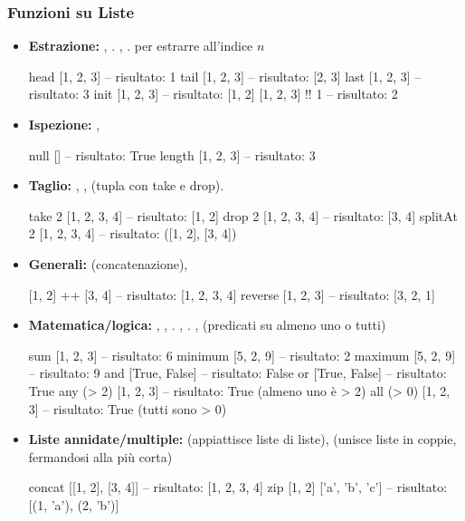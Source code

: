 \documentclass[a4paper,11pt]{report}
\begin{document}
\subsubsection{Funzioni su Liste}
\begin{itemize}
    \item \textbf{Estrazione:} , . , . \code{(!!)} per estrarre all'indice $n$
        \begin{haskellbox}{}
head [1, 2, 3]  -- risultato: 1
tail [1, 2, 3]  -- risultato: [2, 3]
last [1, 2, 3]  -- risultato: 3
init [1, 2, 3]  -- risultato: [1, 2]
[1, 2, 3] !! 1  -- risultato: 2
\end{haskellbox}{}

    \item \textbf{Ispezione:} , 
\begin{haskellbox}{}
null []          -- risultato: True
length [1, 2, 3] -- risultato: 3
\end{haskellbox}{}

    \item \textbf{Taglio:} , ,  (tupla con take e drop).
\begin{haskellbox}{}
take 2 [1, 2, 3, 4]    -- risultato: [1, 2]
drop 2 [1, 2, 3, 4]    -- risultato: [3, 4]
splitAt 2 [1, 2, 3, 4] -- risultato: ([1, 2], [3, 4])
\end{haskellbox}{}

    \item \textbf{Generali:} \code{++} (concatenazione), 
\begin{haskellbox}{}
[1, 2] ++ [3, 4]  -- risultato: [1, 2, 3, 4]
reverse [1, 2, 3] -- risultato: [3, 2, 1]
\end{haskellbox}{}

    \item \textbf{Matematica/logica:} , , . , . ,  (predicati su almeno uno o tutti)
        \begin{haskellbox}{}
sum [1, 2, 3]       -- risultato: 6
minimum [5, 2, 9]   -- risultato: 2
maximum [5, 2, 9]   -- risultato: 9
and [True, False]   -- risultato: False
or [True, False]    -- risultato: True
any (> 2) [1, 2, 3] -- risultato: True (almeno uno è > 2)
all (> 0) [1, 2, 3] -- risultato: True (tutti sono > 0)
\end{haskellbox}{}

    \item \textbf{Liste annidate/multiple:}  (appiattisce liste di liste),  (unisce liste in coppie, fermandosi alla più corta)
\begin{haskellbox}{}
concat [[1, 2], [3, 4]]    -- risultato: [1, 2, 3, 4]
zip [1, 2] ['a', 'b', 'c'] -- risultato: [(1, 'a'), (2, 'b')]
\end{haskellbox}{}
\end{itemize}
\end{document}
